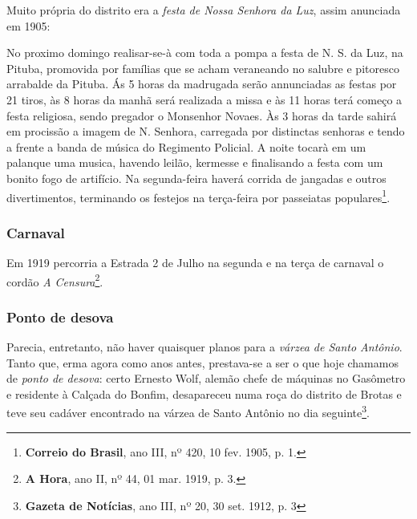 Muito própria do distrito era a \textit{festa de Nossa Senhora da Luz}, assim anunciada em 1905:

\begin{citacao}
No proximo domingo realisar-se-à com toda a pompa a festa de N. S. da Luz, na Pituba, promovida por famílias que se acham veraneando no salubre e pitoresco arrabalde da Pituba.
Ás 5 horas da madrugada serão annunciadas as festas por 21 tiros, às 8 horas da manhã será realizada a missa e às 11 horas terá começo a festa religiosa, sendo pregador o Monsenhor Novaes.
Às 3 horas da tarde sahirá em procissão a imagem de N. Senhora, carregada por distinctas senhoras e tendo a frente a banda de música do Regimento Policial. A noite tocarà em um palanque uma musica, havendo leilão, kermesse e finalisando a festa com um bonito fogo de artifício.
Na segunda-feira haverá corrida de jangadas e outros divertimentos, terminando os festejos na terça-feira por passeiatas populares\footnote{\textbf{Correio do Brasil}, ano III, nº 420, 10 fev. 1905, p. 1.}.
\end{citacao}

\subsubsection{Carnaval}

Em 1919 percorria a Estrada 2 de Julho na segunda e na terça de carnaval o cordão \textit{A Censura}\footnote{\textbf{A Hora}, ano II, nº 44, 01 mar. 1919, p. 3.}.

\subsubsection{Ponto de desova}

Parecia, entretanto, não haver quaisquer planos para a \textit{várzea de Santo Antônio}. Tanto que, erma agora como anos antes, prestava-se a ser o que hoje chamamos de \textit{ponto de desova}: certo Ernesto Wolf, alemão chefe de máquinas no Gasômetro e residente à Calçada do Bonfim, desapareceu numa roça do distrito de Brotas e teve seu cadáver encontrado na várzea de Santo Antônio no dia seguinte\footnote{\textbf{Gazeta de Notícias}, ano III, nº 20, 30 set. 1912, p. 3}.

